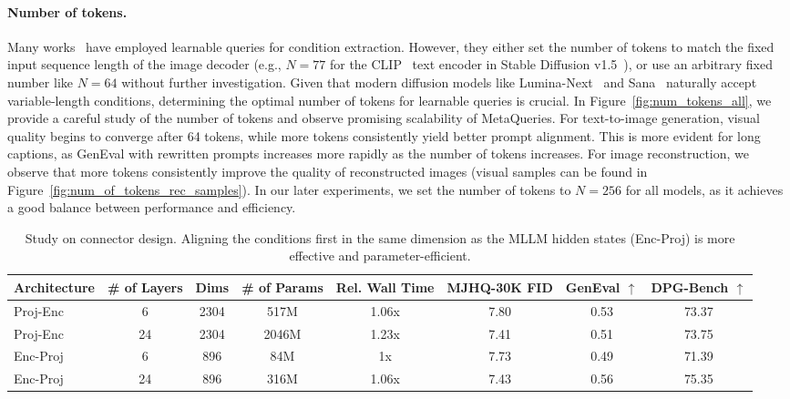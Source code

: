 \documentclass[]{fairmeta}
\newcommand\ours{{\fontfamily{lmtt}\selectfont MetaQueries}\xspace}
\begin{document}
\paragraph{Number of tokens.}
Many works~\citep{nextgpt, kosmosg, seedx} have employed learnable queries for condition extraction. However, they either set the number of tokens to match the fixed input sequence length of the image decoder (e.g., $N=77$ for the CLIP~\citep{clip} text encoder in Stable Diffusion v1.5~\citep{sd1p5}), or use an arbitrary fixed number like $N=64$ without further investigation. Given that modern diffusion models like Lumina-Next~\citep{luminanext} and Sana~\citep{sana} naturally accept variable-length conditions, determining the optimal number of tokens for learnable queries is crucial. In Figure~\ref{fig:num_tokens_all}, we provide a careful study of the number of tokens and observe promising scalability of \ours. For text-to-image generation, visual quality begins to converge after 64 tokens, while more tokens consistently yield better prompt alignment. This is more evident for long captions, as GenEval with rewritten prompts increases more rapidly as the number of tokens increases. For image reconstruction, we observe that more tokens consistently improve the quality of reconstructed images (visual samples can be found in Figure~\ref{fig:num_of_tokens_rec_samples}). In our later experiments, we set the number of tokens to $N=256$ for all models, as it achieves a good balance between performance and efficiency.

\begin{table}[!t]
    \small
    \centering
    \begin{tabular}{lccccccc}
        
        \textbf{Architecture} & \textbf{\# of Layers} & \textbf{Dims} & \textbf{\# of Params} & \textbf{Rel. Wall Time} & \textbf{MJHQ-30K FID } & \textbf{GenEval $\uparrow$} & \textbf{DPG-Bench $\uparrow$} \\
        \midrule
 Proj-Enc & 6 & 2304 & 517M & 1.06x & 7.80 & 0.53 & 73.37 \\
 Proj-Enc & 24 & 2304 & 2046M & 1.23x & \cellcolor{green!10}7.41 & 0.51 & 73.75 \\
 Enc-Proj & 6 & 896 & 84M & 1x & 7.73 & 0.49 & 71.39 \\
 Enc-Proj & 24 & 896 & 316M & 1.06x & 7.43 & \cellcolor{green!10}0.56 & \cellcolor{green!10}75.35 \\
        
    \end{tabular}
    \caption{Study on connector design. Aligning the conditions first in the same dimension as the MLLM hidden states (Enc-Proj) is more effective and parameter-efficient.}
    \label{tab:connector_design}
\end{table}
\end{document}
